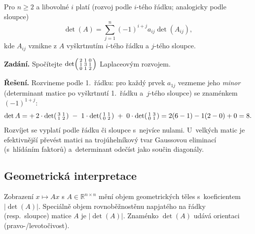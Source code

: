 \documentclass[11pt,a4paper]{article}
\begin{document}
\begin{veta}
Pro $n\ge2$ a libovolné $i$ platí (rozvoj podle $i$-tého řádku; analogicky podle sloupce)
\[
  \det(A)=\sum_{j=1}^n(-1)^{i+j}a_{ij}\det(A_{ij}),
\]
kde $A_{ij}$ vznikne z $A$ vyškrtnutím $i$-tého řádku a $j$-tého sloupce.
\end{veta}

\begin{priklad}
\textbf{Zadání.} Spočítejte $\det\begin{psmallmatrix}2&1&0\\1&3&1\\0&1&2\end{psmallmatrix}$ Laplaceovým rozvojem.\par
\textbf{Řešení.} Rozvineme podle 1.\ řádku: pro každý prvek $a_{1j}$ vezmeme jeho \emph{minor} (determinant matice po vyškrtnutí 1.\ řádku a~$j$-tého sloupce) se znaménkem $(-1)^{1+j}$:
\[
  \det A=+\,2\cdot\det\begin{psmallmatrix}3&1\\1&2\end{psmallmatrix}\;-\;1\cdot\det\begin{psmallmatrix}1&1\\0&2\end{psmallmatrix}\;+\;0\cdot\det\begin{psmallmatrix}1&3\\0&1\end{psmallmatrix}
  =2(6-1)-1(2-0)+0=8.
\]
Rozvíjet se vyplatí podle řádku či sloupce s~nejvíce nulami. U~velkých matic je efektivnější převést matici na trojúhelníkový tvar Gaussovou eliminací (s~hlídáním faktorů) a~determinant odečíst jako součin diagonály.
\end{priklad}

\subsection{Geometrická interpretace}

\begin{veta}
Zobrazení $x\mapsto Ax$ s $A\in\mathbb{R}^{n\times n}$ mění objem geometrických těles s~koeficientem $|\det(A)|$. Speciálně objem rovnoběžnostěnu napjatého na řádky (resp.\ sloupce) matice $A$ je $|\det(A)|$. Znaménko $\det(A)$ udává orientaci (pravo-/levotočivost).
\end{veta}
\end{document}
